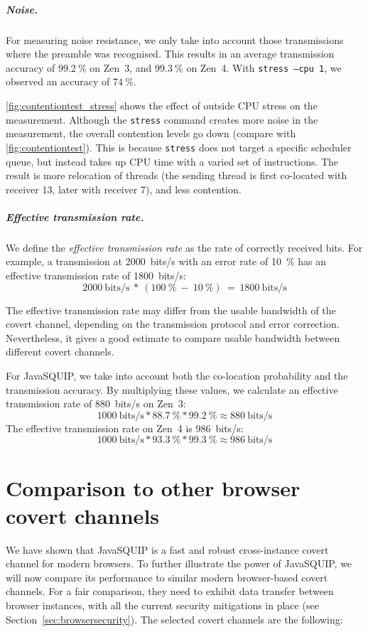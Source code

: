 \documentclass[11pt,
  titlepage=false,
  parskip=half,      %
]{scrreprt}
\begin{document}
\paragraph{Noise.}
For measuring noise resistance, we only take into account those transmissions where the preamble was recognised.
This results in an average transmission accuracy of $99.2~\%$ on Zen~3, and $99.3~\%$ on Zen~4.
With \texttt{stress --cpu 1}, we observed an accuracy of $74~\%$.

\ref{fig:contentiontest_stress} shows the effect of outside CPU stress on the measurement.
Although the \texttt{stress} command creates more noise in the measurement, the overall contention levels go down (compare with \ref{fig:contentiontest}).
This is because \texttt{stress} does not target a specific scheduler queue, but instead takes up CPU time with a varied set of instructions.
The result is more relocation of threads (the sending thread is first co-located with receiver 13, later with receiver 7), and less contention.

\paragraph{Effective transmission rate.}
We define the \textit{effective transmission rate} as the rate of correctly received bits.
For example, a transmission at 2000~bits/s with an error rate of 10~\%
has an effective transmission rate of 1800~bits/s:
\[2000~\text{bits/s}~*~(100~\%~-~10~\%)~=~1800~\text{bits/s}\]

The effective transmission rate may differ from the usable bandwidth of the covert channel,
depending on the transmission protocol and error correction.
Nevertheless, it gives a good estimate to compare usable bandwidth between different covert channels.

For JavaSQUIP, we take into account both the co-location probability and the transmission accuracy.
By multiplying these values, we calculate an effective transmission rate of 880~bits/s on Zen~3:
\[1000~\text{bits/s} * 88.7~\% * 99.2~\% \approx 880~\text{bits/s}\]
The effective transmission rate on Zen~4 is 986~bits/s:
\[1000~\text{bits/s} * 93.3~\% * 99.3~\% \approx 986~\text{bits/s}\]

\chapter{Comparison to other browser covert channels}
\label{ch:comparison}
We have shown that JavaSQUIP is a fast and robust cross-instance covert channel for modern browsers.
To further illustrate the power of JavaSQUIP,
we will now compare its performance to similar modern browser-based covert channels.
For a fair comparison, they need to exhibit data transfer between browser instances,
with all the current security mitigations in place (see Section~\ref{sec:browsersecurity}).
The selected covert channels are the following:
\end{document}
